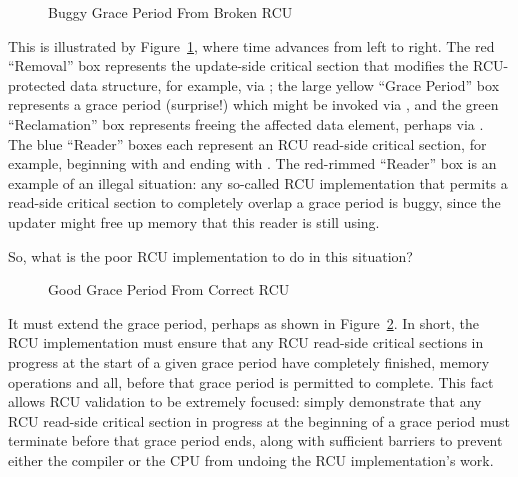 \begin{figure}[htb]
\centering
{}
\caption{Buggy Grace Period From Broken RCU}
\label{app:rcuimpl:Buggy Grace Period From Broken RCU}
\end{figure}

This is illustrated by
Figure~\ref{app:rcuimpl:Buggy Grace Period From Broken RCU},
where time advances from left to right.
The red ``Removal'' box represents the update-side critical section that
modifies the RCU-protected data structure, for example, via
; the large yellow ``Grace Period'' box
represents a grace period (surprise!) which might be invoked via
, and the green ``Reclamation'' box
represents freeing the affected data element,
perhaps via .
The blue ``Reader'' boxes each represent an RCU read-side critical section,
for example, beginning with  and ending with
.
The red-rimmed ``Reader'' box is an example of an illegal situation:
any so-called RCU implementation that permits a read-side critical section
to completely overlap a grace period is buggy, since the updater might
free up memory that this reader is still using.

So, what is the poor RCU implementation to do in this situation?

\begin{figure}[htb]
\centering
{}
\caption{Good Grace Period From Correct RCU}
\label{app:rcuimpl:Good Grace Period From Correct RCU}
\end{figure}

It must extend the grace period, perhaps as shown in
Figure~\ref{app:rcuimpl:Good Grace Period From Correct RCU}.
In short, the RCU implementation must ensure that any
RCU read-side critical sections in progress at the start of a given grace
period have completely finished, memory operations and all, before that
grace period is permitted to complete.
This fact allows RCU validation to be extremely focused: simply demonstrate
that any RCU read-side critical section in progress at the beginning of
a grace period must terminate before that grace period ends, along with
sufficient barriers to prevent either the compiler or the CPU from undoing
the RCU implementation's work.

